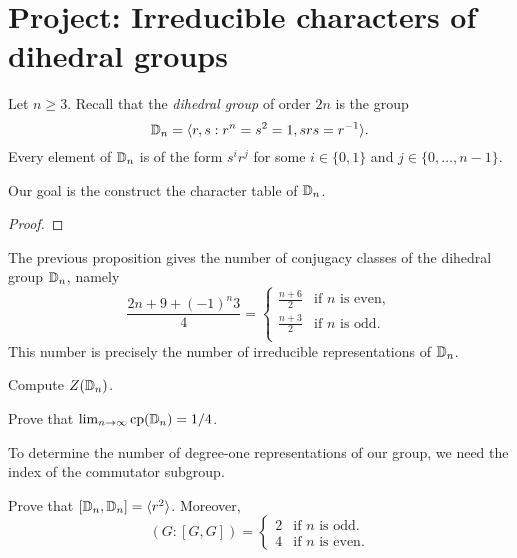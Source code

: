 \section{Project: Irreducible characters of dihedral groups}

Let $n\geq3$. 
Recall that the \emph{dihedral group} of order $2n$ 
is the group
\[
\mathbb{D}_{n}=\langle r,s:r^n=s^2=1,srs=r^{-1}\rangle. 
\]
Every element of $\mathbb{D}_{n}$ is of the form
$s^ir^j$ for some $i\in\{0,1\}$ and $j\in\{0,\dots,n-1\}$. 

Our goal is the construct the character table of $\mathbb{D}_{n}$. 

\begin{proposition}
\label{pro:classes_dihedral}
        
\end{proposition}

\begin{proof}
    
\end{proof}

The previous proposition gives the number of conjugacy classes of the dihedral group $\mathbb{D}_n$, namely
\[
\frac{2n+9+(-1)^n3}{4}=\begin{cases}
    \frac{n+6}{2} & \text{if $n$ is even},\\
    \frac{n+3}{2} & \text{if $n$ is odd}.\\
\end{cases}
\]
This number is precisely the number of irreducible representations of $\mathbb{D}_n$. 

\begin{exercise}
\label{xca:center_dihedral}
    Compute $Z(\mathbb{D}_n)$. 
\end{exercise}

\begin{exercise}
\label{xca:cp_dihedral}
    Prove that $\lim_{n\to\infty}\operatorname{cp}(\mathbb{D}_{n})=1/4$.
\end{exercise}

To determine the number of degree-one representations of our group, 
we need the index of the commutator subgroup.

\begin{exercise}
\label{xca:commutator_dihedral}
    Prove that $[\mathbb{D}_n,\mathbb{D}_n]=\langle r^2\rangle$. Moreover, 
    \[
    (G:[G,G])=\begin{cases}
        2 & \text{if $n$ is odd.}\\
        4 & \text{if $n$ is even.}
    \end{cases}
    \]
\end{exercise}


